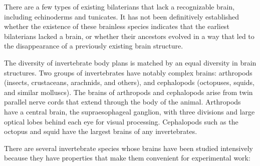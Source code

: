 There are a few types of existing bilaterians that lack a recognizable brain, including echinoderms and tunicates. It has not been definitively established whether the existence of these brainless species indicates that the earliest bilaterians lacked a brain, or whether their ancestors evolved in a way that led to the disappearance of a previously existing brain structure.

The diversity of invertebrate body plans is matched by an equal diversity in brain structures. Two groups of invertebrates have notably complex brains: arthropods (insects, crustaceans, arachnids, and others), and cephalopods (octopuses, squids, and similar molluscs). The brains of arthropods and cephalopods arise from twin parallel nerve cords that extend through the body of the animal. Arthropods have a central brain, the supraesophageal ganglion, with three divisions and large optical lobes behind each eye for visual processing. Cephalopods such as the octopus and squid have the largest brains of any invertebrates.

There are several invertebrate species whose brains have been studied intensively because they have properties that make them convenient for experimental work:

